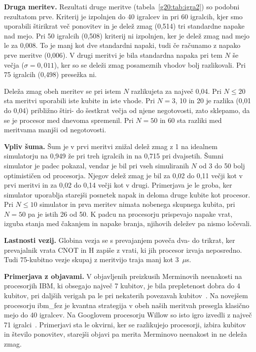 \textbf{Druga meritev.} Rezultati druge meritve (tabela~\ref{g20:tab:igra2}) so podobni rezultatom prve. Kriterij je izpolnjen do 40 igralcev in pri 60 igralcih, kjer smo uporabili štirikrat več ponovitev in je delež zmag (0,514) tri standardne napake nad mejo. Pri 50 igralcih (0,508) kriterij ni izpolnjen, ker je delež zmag nad mejo le za 0,008. To je manj kot dve standardni napaki, tudi če računamo z napako prve meritve (0,006). V drugi meritvi je bila standardna napaka pri tem $N$ še večja ($\sigma=0{,}011$), ker so se deleži zmag posameznih vhodov bolj razlikovali. Pri 75 igralcih (0,498) presežka ni.

Deleža zmag obeh meritev se pri istem $N$ razlikujeta za največ 0,04. Pri $N\le20$ sta meritvi uporabili iste kubite in iste vhode. Pri $N=3$, 10 in 20 je razlika (0,01 do 0,04) približno štiri- do šestkrat večja od njene negotovosti, zato sklepamo, da se je procesor med dnevoma spremenil. Pri $N=50$ in 60 sta razliki med meritvama manjši od negotovosti.

\textbf{Vpliv šuma.} Šum je v prvi meritvi znižal delež zmag z 1 na idealnem simulatorju na 0,949 že pri treh igralcih in na 0,715 pri dvajsetih. Šumni simulator je padec pokazal, vendar je bil pri vseh simuliranih $N$ od 3 do 50 bolj optimističen od procesorja. Njegov delež zmag je bil za 0,02 do 0,11 večji kot v prvi meritvi in za 0,02 do 0,14 večji kot v drugi. Primerjava je le groba, ker simulator uporablja starejši posnetek napak in deloma druge kubite kot procesor. Pri $N\le10$ simulator in prva meritev nimata nobenega skupnega kubita, pri $N=50$ pa je istih 26 od 50. K padcu na procesorju prispevajo napake vrat, izguba stanja med čakanjem in napake branja, njihovih deležev pa nismo ločevali.

\textbf{Lastnosti vezij.} Globina vezja se s prevajanjem poveča dva- do trikrat, ker prevajalnik vrata CNOT in H zapiše z vrati, ki jih procesor izvaja neposredno. Tudi 75-kubitno vezje skupaj z meritvijo traja manj kot 3~$\mu$s.

\textbf{Primerjava z objavami.} V objavljenih preizkusih Merminovih neenakosti na procesorjih IBM, ki obsegajo največ 7 kubitov, je bila prepletenost dobra do 4 kubitov, pri daljših verigah pa le pri nekaterih povezavah kubitov~\cite{g20:huang2020}. Na novejšem procesorju ibm\_fez je kvantna strategija v obeh naših meritvah presegla klasično mejo do 40 igralcev. Na Googlovem procesorju Willow so isto igro izvedli z največ 71 igralci~\cite{g20:kumar2025}. Primerjavi sta le okvirni, ker se razlikujejo procesorji, izbira kubitov in število ponovitev, starejši objavi pa merita Merminovo neenakost in ne deleža zmag.


